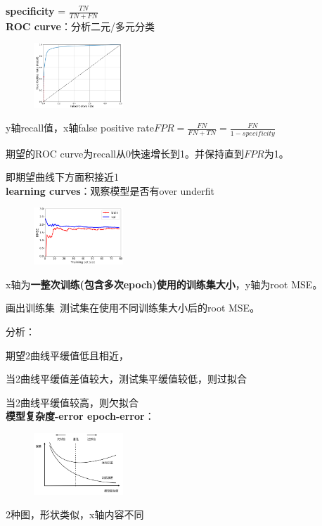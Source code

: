 \documentclass[UTF8]{ctexart}
\begin{document}
  \textbf{specificity} = $\frac{TN}{TN + FN}$\\
\textbf{ROC curve}：分析二元/多元分类

  \begin{figure}[H] %
    \centering %
    \includegraphics[width=0.3\textwidth]{note_images/ROC_curve.png} %
  \end{figure}

  y轴recall值，x轴false positive rate$FPR = \frac{FN}{FN + TN} = \frac{FN}{1-specificity}$

  期望的ROC curve为recall从0快速增长到1。并保持直到$FPR$为1。
  
  \quad 即期望曲线下方面积接近1\\
\textbf{learning curves}：观察模型是否有over underfit

  \begin{figure}[H] %
    \centering %
    \includegraphics[width=0.3\textwidth]{note_images/learning_curve.png} %
  \end{figure}

  x轴为\textbf{一整次训练(包含多次epoch)使用的训练集大小}，y轴为root MSE。

  画出训练集\ 测试集在使用不同训练集大小后的root MSE。

  分析：

  \quad 期望2曲线平缓值低且相近，

  \quad 当2曲线平缓值差值较大，测试集平缓值较低，则过拟合

  \quad 当2曲线平缓值较高，则欠拟合\\
\textbf{模型复杂度-error epoch-error}：

  \begin{figure}[H] %
    \centering %
    \includegraphics[width=0.3\textwidth]{note_images/epoch-complex-error.png} %
  \end{figure}

  2种图，形状类似，x轴内容不同\\
\end{document}
